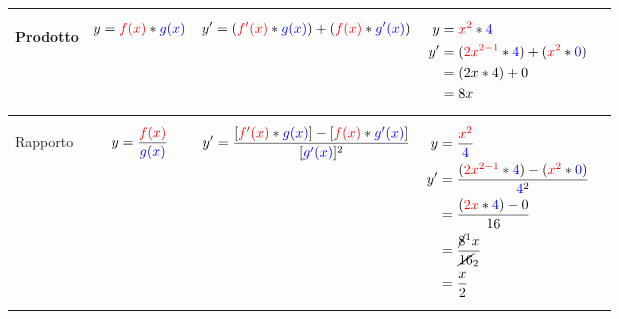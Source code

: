 \documentclass[../../main]{subfiles}
\begin{document}
\begin{center}
\begin{longtable}{ |p{5em} | p{5em} | p{5em} | p{7em} | p{2cm}| }
            \hline
            
            \begin{center}
                Prodotto
            \end{center} &
            \begin{align*}
                y= {\color{red}f(x)} * {\color{blue}g(x)} 
            \end{align*}  &
            \begin{align*}
                y'= ({\color{red}f'(x)} * {\color{blue}g(x)} ) + ( {\color{red}f(x)} * {\color{blue}g'(x)}) 
            \end{align*} &
            {
                \begin{align*}
                    y  &= {\color{red}x^2} * {\color{blue}4}    \\
                    y' &= ( {\color{red}2x^{2-1}} * {\color{blue}4} ) + ( {\color{red}x^2} * {\color{blue}0} )  \\
                        &= (2x * 4) + 0  \\
                        &= 8x  
                \end{align*}
            } &
            \begin{center}
            \end{center} \\ 

            \hline
            
            \begin{center}
                Rapporto
            \end{center} &
            \begin{align*}
                y= \frac{\color{red}f(x)}{\color{blue}g(x)} 
            \end{align*}  &
            \begin{align*}
                y'= \frac{[{\color{red}f'(x)} * {\color{blue}g(x)} ] - [ {\color{red}f(x)} * {\color{blue}g'(x)}]}{[{\color{blue}g'(x)}]^2} 
            \end{align*} &
            {
                \begin{align*}
                    y  &= \frac{\color{red}x^2}{\color{blue}4}    \\
                    y' &= \frac{( {\color{red}2x^{2-1}} * {\color{blue}4} ) - ( {\color{red}x^2} * {\color{blue}0} )}{{\color{blue}4}^2}  \\
                        &= \frac{({\color{red}2x} * {\color{blue}4}) - 0}{16}  \\
                        &= \frac{\cancel{8}^1x}{\cancel{16}_2}   \\
                        &= \frac{x}{2} 
                \end{align*}
            } &
            \begin{center}
            \end{center} \\ 


\end{longtable}
\end{center}
\end{document}
